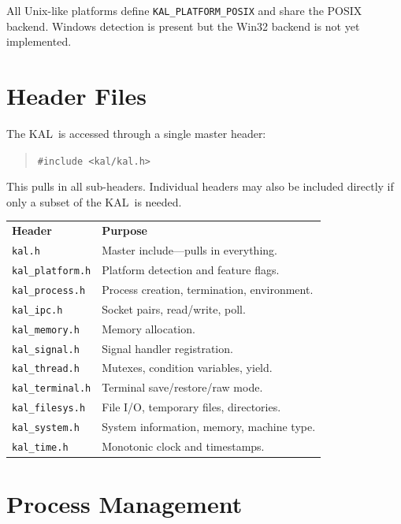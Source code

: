 \documentclass[11pt,twoside]{article}
\newcommand{\KAL}{KAL}
\begin{document}
All Unix-like platforms define {\tt KAL\_PLATFORM\_POSIX} and share
the POSIX backend.  Windows detection is present but the Win32
backend is not yet implemented.

\newpage
\section{Header Files}

The \KAL\ is accessed through a single master header:

\begin{quote}
{\tt \#include <kal/kal.h>}
\end{quote}

This pulls in all sub-headers.  Individual headers may also be
included directly if only a subset of the \KAL\ is needed.

\bigskip
\noindent
\begin{tabularx}{\textwidth}{lX}
{\bf Header} & {\bf Purpose} \\[2pt]
{\tt kal.h}            & Master include---pulls in everything. \\
{\tt kal\_platform.h}  & Platform detection and feature flags. \\
{\tt kal\_process.h}   & Process creation, termination, environment. \\
{\tt kal\_ipc.h}       & Socket pairs, read/write, poll. \\
{\tt kal\_memory.h}    & Memory allocation. \\
{\tt kal\_signal.h}    & Signal handler registration. \\
{\tt kal\_thread.h}    & Mutexes, condition variables, yield. \\
{\tt kal\_terminal.h}  & Terminal save/restore/raw mode. \\
{\tt kal\_filesys.h}   & File I/O, temporary files, directories. \\
{\tt kal\_system.h}    & System information, memory, machine type. \\
{\tt kal\_time.h}      & Monotonic clock and timestamps. \\
\end{tabularx}

\newpage
\section{Process Management}
\label{sec:process}
\end{document}
